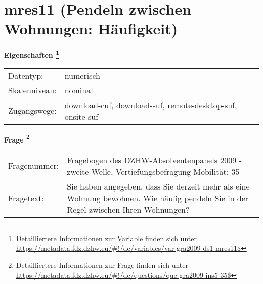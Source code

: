 
    \setcounter{footnote}{0}

    \vspace*{-1.8cm}
	\section{mres11 (Pendeln zwischen Wohnungen: Häufigkeit)}
	\label{section:mres11}



    \vspace*{0.5cm}
    \noindent\textbf{Eigenschaften
	\footnote{Detailliertere Informationen zur Variable finden sich unter
		\url{https://metadata.fdz.dzhw.eu/\#!/de/variables/var-gra2009-ds1-mres11$}}}\\
	\begin{tabularx}{\hsize}{@{}lX}
	Datentyp: & numerisch \\
	Skalenniveau: & nominal \\
	Zugangswege: &
	  download-cuf, 
	  download-suf, 
	  remote-desktop-suf, 
	  onsite-suf
 \\
    \end{tabularx}



				\vspace*{0.5cm}
                \noindent\textbf{Frage
	                \footnote{Detailliertere Informationen zur Frage finden sich unter
		              \url{https://metadata.fdz.dzhw.eu/\#!/de/questions/que-gra2009-ins5-35$}}}\\
				\begin{tabularx}{\hsize}{@{}lX}
					Fragenummer: &
					  Fragebogen des DZHW-Absolventenpanels 2009 - zweite Welle, Vertiefungsbefragung Mobilität:
					  35
 \\
					Fragetext: & Sie haben angegeben, dass Sie derzeit mehr als eine Wohnung bewohnen. Wie häufig pendeln Sie in der Regel zwischen Ihren Wohnungen? \\
				\end{tabularx}





